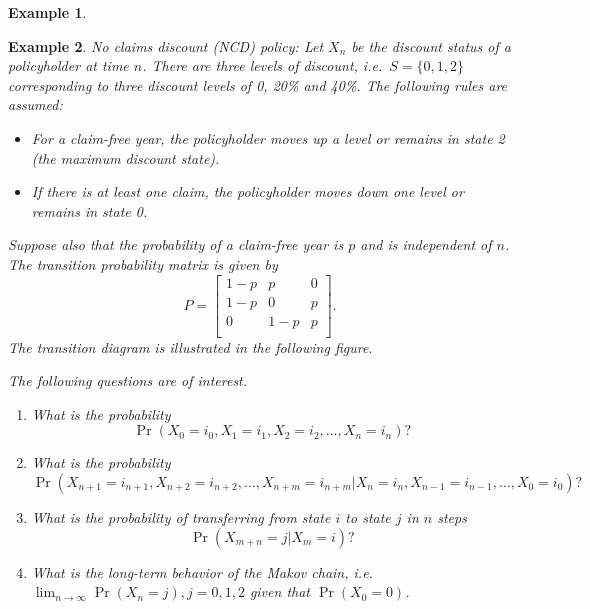 \documentclass[
]{book}
\theoremstyle{definition}
\theoremstyle{definition}
\newtheorem{example}{Example}[chapter]
\theoremstyle{definition}
\theoremstyle{definition}
\theoremstyle{remark}
\begin{document}
\begin{example}
\protect\hypertarget{exm:NCD}{}\label{exm:NCD}

\textbf{Example 2}. \emph{No claims discount (NCD) policy: Let \(X_n\) be the
discount status of a policyholder at time \(n\). There are three levels of
discount, i.e.~\(S = \{0,1,2\}\) corresponding to three discount levels of
0, 20\% and 40\%. The following rules are assumed:}

\begin{itemize}
\item
  \emph{For a claim-free year, the policyholder moves up a level or remains
  in state 2 (the maximum discount state).}
\item
  \emph{If there is at least one claim, the policyholder moves down one
  level or remains in state 0.}
\end{itemize}

\emph{Suppose also that the probability of a claim-free year is \(p\) and is
independent of \(n\). The transition probability matrix is given by
\[P = \begin{bmatrix}
    1- p & p & 0    \\
    1-p & 0 & p   \\
    0 & 1-p & p    \\
\end{bmatrix}.\] The transition diagram is illustrated in the following
figure.}

\emph{The following questions are of interest.}

\begin{enumerate}
\def\labelenumi{\arabic{enumi}.}
\item
  \emph{What is the probability
  \[\Pr(X_0 = i_0, X_1 = i_1, X_2 = i_2, \ldots, X_n = i_n)?\]}
\item
  \emph{What is the probability
  \[\Pr(X_{n+1} = i_{n+1}, X_{n+2} = i_{n+2},  \ldots, X_{n+m} = i_{n+m}| X_n = i_n, X_{n-1} = i_{n-1}, \ldots, X_0 = i_{0})?\]}
\item
  \emph{What is the probability of transferring from state \(i\) to state \(j\)
  in \(n\) steps \[\Pr(X_{m+n} = j | X_m = i )?\]}
\item
  \emph{What is the long-term behavior of the Makov chain, i.e.
  \(\lim_{n \rightarrow \infty} \Pr(X_n = j), j = 0,1,2\) given that
  \(\Pr(X_0 = 0)\).}
\end{enumerate}

\end{example}
\end{document}
